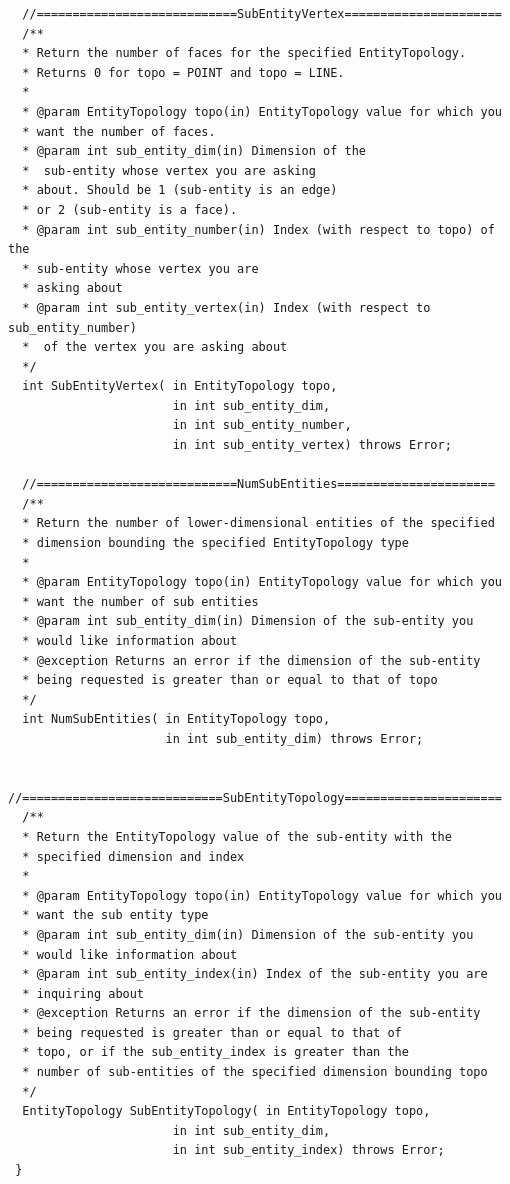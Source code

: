 \documentclass{article}
\begin{document}
\begin{small}
\begin{verbatim}
  //============================SubEntityVertex======================
  /** 
  * Return the number of faces for the specified EntityTopology. 
  * Returns 0 for topo = POINT and topo = LINE.   
  * 
  * @param EntityTopology topo(in) EntityTopology value for which you  
  * want the number of faces. 
  * @param int sub_entity_dim(in) Dimension of the  
  *  sub-entity whose vertex you are asking  
  * about. Should be 1 (sub-entity is an edge) 
  * or 2 (sub-entity is a face). 
  * @param int sub_entity_number(in) Index (with respect to topo) of the  
  * sub-entity whose vertex you are  
  * asking about 
  * @param int sub_entity_vertex(in) Index (with respect to sub_entity_number)   
  *  of the vertex you are asking about 
  */ 
  int SubEntityVertex( in EntityTopology topo,  
                       in int sub_entity_dim,  
                       in int sub_entity_number,  
                       in int sub_entity_vertex) throws Error;

  //============================NumSubEntities======================
  /** 
  * Return the number of lower-dimensional entities of the specified 
  * dimension bounding the specified EntityTopology type 
  * 
  * @param EntityTopology topo(in) EntityTopology value for which you  
  * want the number of sub entities 
  * @param int sub_entity_dim(in) Dimension of the sub-entity you 
  * would like information about 
  * @exception Returns an error if the dimension of the sub-entity 
  * being requested is greater than or equal to that of topo 
  */ 
  int NumSubEntities( in EntityTopology topo,  
                      in int sub_entity_dim) throws Error;

  //============================SubEntityTopology======================
  /** 
  * Return the EntityTopology value of the sub-entity with the 
  * specified dimension and index 
  * 
  * @param EntityTopology topo(in) EntityTopology value for which you  
  * want the sub entity type 
  * @param int sub_entity_dim(in) Dimension of the sub-entity you 
  * would like information about 
  * @param int sub_entity_index(in) Index of the sub-entity you are 
  * inquiring about 
  * @exception Returns an error if the dimension of the sub-entity 
  * being requested is greater than or equal to that of 
  * topo, or if the sub_entity_index is greater than the  
  * number of sub-entities of the specified dimension bounding topo 
  */ 
  EntityTopology SubEntityTopology( in EntityTopology topo,  
                       in int sub_entity_dim, 
                       in int sub_entity_index) throws Error;
 }
\end{verbatim}
\end{small}
\end{document}
